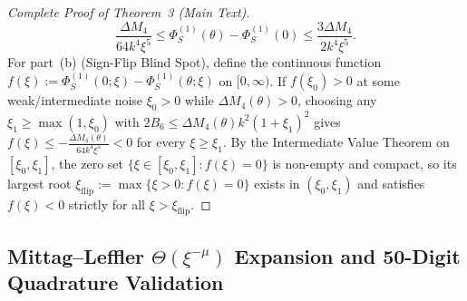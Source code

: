 \documentclass[onecolumn,10pt,notitlepage,amsmath,amssymb,floatfix]{revtex4-2}
\theoremstyle{plain}
\theoremstyle{definition}
\newcommand{\xiflip}{\xi_{\mathrm{flip}}}
\begin{document}
\begin{proof}[Complete Proof of Theorem~3 (Main Text)]
\begin{equation}
\label{eq:S2_xi5_final}
\frac{\Delta M_4}{64 k^4 \xi^5} \le \Phi_S^{(1)}(\theta) - \Phi_S^{(1)}(0) \le \frac{3\Delta M_4}{2 k^4 \xi^5}.
\end{equation}
For part~(b) (Sign-Flip Blind Spot), define the continuous function $f(\xi) := \Phi_S^{(1)}(0; \xi) - \Phi_S^{(1)}(\theta; \xi)$ on $[0,\infty)$. If $f(\xi_0) > 0$ at some weak/intermediate noise $\xi_0 > 0$ while $\Delta M_4(\theta) > 0$, choosing any $\xi_1 \ge \max(1, \xi_0)$ with $2 B_6 \le \Delta M_4(\theta) k^2(1+\xi_1)^2$ gives $f(\xi) \le -\frac{\Delta M_4(\theta)}{64 k^4 \xi^5} < 0$ for every $\xi \ge \xi_1$. By the Intermediate Value Theorem on $[\xi_0, \xi_1]$, the zero set $\{ \xi \in [\xi_0, \xi_1] : f(\xi) = 0 \}$ is non-empty and compact, so its largest root $\xiflip := \max\{\xi > 0 : f(\xi) = 0\}$ exists in $(\xi_0, \xi_1)$ and satisfies $f(\xi) < 0$ strictly for all $\xi > \xiflip$.
\end{proof}

\subsection{Mittag--Leffler \texorpdfstring{$\Theta(\xi^{-\mu})$}{Theta(xi\^{}(-mu))} Expansion and 50-Digit Quadrature Validation}
\end{document}
